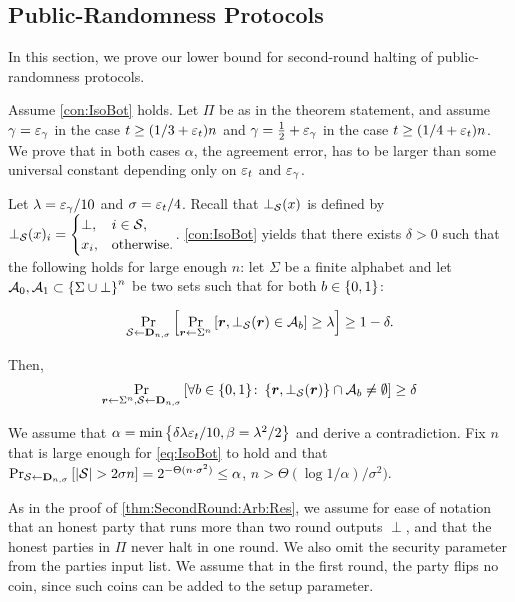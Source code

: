 \subsection{Public-Randomness Protocols}\label{sec:TwoRoundProtcol:PR}
In this section, we prove  our lower bound for  second-round halting of public-randomness  protocols.


\begin{theorem} \label{thm:SecondRound:PR:Res}
	\ThmSeconRoundPR
\end{theorem}

Assume \cref{con:IsoBot} holds. Let $\Pi$ be as in the theorem statement, and assume $\gamma= \varepsilon_\gamma$ in the case $t \ge (1/3 +\varepsilon_t)n$  and $\gamma=  \tfrac{1}{2} +  \varepsilon_\gamma$ in the case  $t \ge (1/4 +\varepsilon_t)n$. We prove that in both cases $\alpha$, the agreement error,  has to be larger than some universal constant depending only  on $\varepsilon_t$ and $\varepsilon_\gamma$.


Let  $\lambda =\varepsilon_\gamma /10$ and $\sigma= \varepsilon_t/4$. Recall that $\bot_{\mathcal{S}}(x)$ is defined by $
\bot_{\mathcal{S}}(x)_i=
\begin{cases}
\bot, & i\in {\cal{S}},\\
x_i, & \text{otherwise}.
\end{cases}
$.  \cref{con:IsoBot} yields that there exists $\delta>0$ such that the following holds for large enough $n$: let $\Sigma$ be a finite alphabet and let $\mathcal{A}_0,\mathcal{A}_1 \subset \left\{\Sigma \cup \bot\right\}^n$  be  two  sets such that for both $b\in \{0,1\}$:

\begin{align*}%
\ppr{\cs\gets \bns}{\ppr{\vr \gets \sn}{\vr,\bot_{\cS}(\vr) \in \cA_b} \ge  \lambda } \ge 1-\delta.
\end{align*}

Then,
\begin{align}\label{eq:IsoBot}
\Pr_{{ \boldsymbol{r}}\gets \Sigma^n,\mathcal{S} \gets \mathbf{D}_{n,\sigma}}\left[\forall b\in \{0,1\}\colon  \left\{{ \boldsymbol{r}},\bot_{\mathcal{S}}({ \boldsymbol{r}})\right\}  \cap \mathcal{A}_b \neq \emptyset\right] \ge  \delta
\end{align}


We assume that  $\alpha = \min\left\{\delta\lambda \varepsilon_t/10, \beta = \lambda^2/2\right\}$  and derive a contradiction.   Fix  $n$  that is large enough for  \cref{eq:IsoBot} to hold and that $\Pr_{{\cal{S}} \gets \mathbf{D}_{n,\sigma}}\left[\left|{\cal{S}}\right| > 2\sigma n\right] = 2^{- \Theta(n\cdot \sigma^2)} \le \alpha$, \ie $n> \Theta(\log 1/\alpha)/\sigma^2)$.


As in the proof of \cref{thm:SecondRound:Arb:Res}, we assume for ease of notation that an honest party that runs more than two round outputs $\perp$, and that the honest parties in $\Pi$ never halt in one round. We also  omit the security parameter from the parties input list. We  assume \wlg that in the first round, the party flips no coin, since such coins can be added to the setup parameter.

